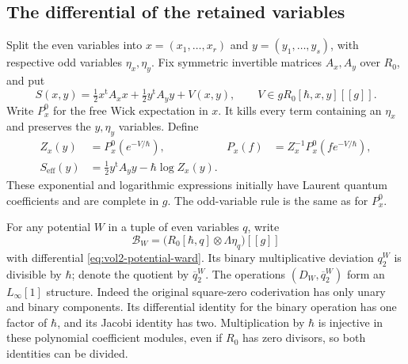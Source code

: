 \subsection{The differential of the retained variables}

Split the even variables into $x=(x_1,\ldots,x_r)$ and
$y=(y_1,\ldots,y_s)$, with respective odd variables
$\eta_x,\eta_y$. Fix symmetric invertible matrices $A_x,A_y$
over $R_0$, and put
\begin{equation}\label{eq:vol2-conditional-potential}
 S(x,y)=\tfrac12x^{\mathrm t}A_xx
             +\tfrac12y^{\mathrm t}A_yy+V(x,y),
 \qquad V\in gR_0[\hbar,x,y][[g]].
\end{equation}
Write $P_x^0$ for the free Wick expectation in $x$. It kills
every term containing an $\eta_x$ and preserves the
$y,\eta_y$ variables. Define
\begin{equation}\label{eq:vol2-conditional-expectation}
 \begin{aligned}
 Z_x(y)&=P_x^0(e^{-V/\hbar}),&
 P_x(f)&=Z_x^{-1}P_x^0(fe^{-V/\hbar}),\\
 S_{\mathrm{eff}}(y)&=\tfrac12y^{\mathrm t}A_yy
                                      -\hbar\log Z_x(y).
 \end{aligned}
\end{equation}
These exponential and logarithmic expressions initially have
Laurent quantum coefficients and are complete in $g$.
The odd-variable rule is the same as for $P_x^0$.

For any potential $W$ in a tuple of even variables $q$, write
\[
 \mathcal B_W=
       \bigl(R_0[\hbar,q]\otimes\Lambda\eta_q\bigr)[[g]]
\]
with differential \eqref{eq:vol2-potential-ward}.
Its binary multiplicative deviation $q_2^W$ is divisible by
$\hbar$; denote the quotient by $\overline q_2^W$.
The operations $(D_W,\overline q_2^W)$ form an
$L_\infty[1]$ structure. Indeed the original square-zero
coderivation has only unary and binary components. Its
differential identity for the binary operation has one
factor of $\hbar$, and its Jacobi identity has two.
Multiplication by $\hbar$ is injective in these polynomial
coefficient modules, even if $R_0$ has zero divisors, so both
identities can be divided.

